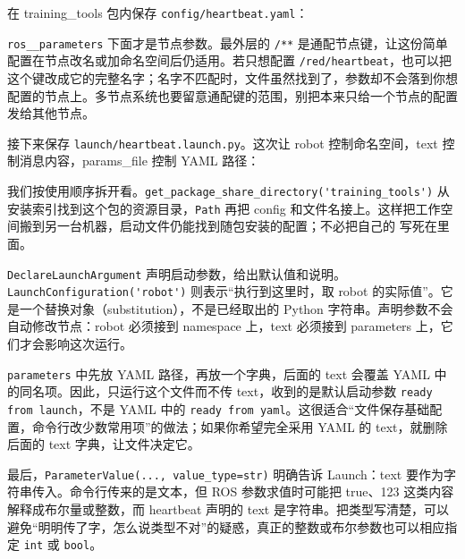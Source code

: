 \begin{example}
在 training\_tools 包内保存 \nolinkurl{config/heartbeat.yaml}：
\par\medskip\noindent\begin{minipage}{\linewidth}

\end{minipage}\par\smallskip
\texttt{ros\_\_parameters} 下面才是节点参数。最外层的 \texttt{/**} 是通配节点键，让这份简单配置在节点改名或加命名空间后仍适用。若只想配置 \nolinkurl{/red/heartbeat}，也可以把这个键改成它的完整名字；名字不匹配时，文件虽然找到了，参数却不会落到你想配置的节点上。多节点系统也要留意通配键的范围，别把本来只给一个节点的配置发给其他节点。

接下来保存 \nolinkurl{launch/heartbeat.launch.py}。这次让 robot 控制命名空间，text 控制消息内容，params\_file 控制 YAML 路径：
\par\medskip\noindent\begin{minipage}{\linewidth}

\end{minipage}\par\smallskip

我们按使用顺序拆开看。\nolinkurl{get_package_share_directory('training_tools')} 从安装索引找到这个包的资源目录，\texttt{Path} 再把 config 和文件名接上。这样把工作空间搬到另一台机器，启动文件仍能找到随包安装的配置；不必把自己的  写死在里面。

\nolinkurl{DeclareLaunchArgument} 声明启动参数，给出默认值和说明。\nolinkurl{LaunchConfiguration('robot')} 则表示“执行到这里时，取 robot 的实际值”。它是一个替换对象（substitution），不是已经取出的 Python 字符串。声明参数不会自动修改节点：robot 必须接到 namespace 上，text 必须接到 parameters 上，它们才会影响这次运行。

\texttt{parameters} 中先放 YAML 路径，再放一个字典，后面的 text 会覆盖 YAML 中的同名项。因此，只运行这个文件而不传 text，收到的是默认启动参数 \texttt{ready from launch}，不是 YAML 中的 \texttt{ready from yaml}。这很适合“文件保存基础配置，命令行改少数常用项”的做法；如果你希望完全采用 YAML 的 text，就删除后面的 text 字典，让文件决定它。

最后，\texttt{ParameterValue(..., value\_type=str)} 明确告诉 Launch：text 要作为字符串传入。命令行传来的是文本，但 ROS 参数求值时可能把 true、123 这类内容解释成布尔量或整数，而 heartbeat 声明的 text 是字符串。把类型写清楚，可以避免“明明传了字，怎么说类型不对”的疑惑，真正的整数或布尔参数也可以相应指定 \texttt{int} 或 \texttt{bool}。


\end{example}
